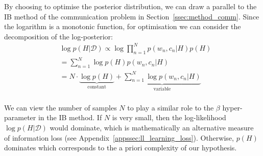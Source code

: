 \documentclass[11pt]{article}
\begin{document}

By choosing to optimise the posterior distribution, we can draw a parallel to the IB method of the communication problem in Section~\ref{ssec:method_comm}. Since the logarithm is a monotonic function, for optimisation we can consider the decomposition of the log-posterior:
\begin{align*}
        & \log p(H|\mathcal{D}) \propto \log \prod_{n=1}^{N} p(w_n, c_n|H)p(H) \\
        &  =\sum_{n=1}^{N} \log p(H) p(w_n, c_n|H) \\
        &  =N\cdot\underbrace{\log p(H)}_{\text{constant}} + \underbrace{\sum_{n=1}^{N} \log p(w_n, c_n|H)}_{\text{variable}} \\
    \label{eq:learning_objective_log_pH_D}
\end{align*}

We can view the number of samples $N$ to play a similar role to the $\beta$ hyper-parameter in the IB method. If $N$ is very small, then the log-likelihood $\log p(H|\mathcal{D})$ would dominate, which is mathematically an alternative measure of information loss (see Appendix~\ref{appssec:ll_learning_loss}). Otherwise, $p(H)$ dominates which corresponds to the a priori complexity of our hypothesis.




\end{document}

